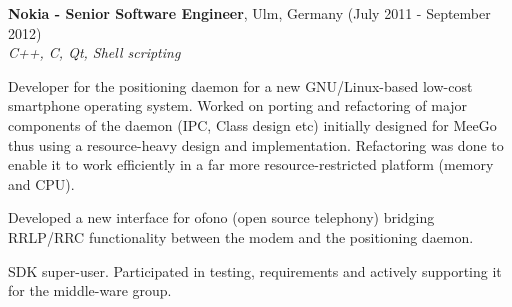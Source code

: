 \documentclass[alan.tex]{subfiles}
\begin{document}
\item \textbf{Nokia - Senior Software Engineer}, Ulm, Germany (July 2011 - September 2012)\\
  \emph{C++, C, Qt, Shell scripting}
  \begin{my_desc}
    \item[Developer] for the positioning daemon for a new GNU/Linux-based low-cost smartphone operating system. Worked on porting and refactoring of major components of the daemon (IPC, Class design etc) initially designed for MeeGo thus using a resource-heavy design and implementation. Refactoring was done to enable it to work efficiently in a far more resource-restricted platform (memory and CPU).
    \item[Developed] a new interface for ofono (open source telephony) bridging RRLP/RRC functionality between the modem and the positioning daemon.
    \item[SDK] super-user. Participated in testing, requirements and actively supporting it for the middle-ware group.
  \end{my_desc}
\end{document}
